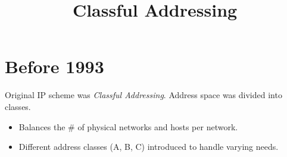 \documentclass{article}
\title{Classful Addressing}
\begin{document}
\maketitle

\section*{Before 1993}
Original IP scheme was \emph{Classful Addressing}. Address space was divided into classes.
\begin{itemize}
    \item Balances the \# of physical networks and hosts per network.
    \item Different address classes (A, B, C) introduced to handle varying needs.
\end{itemize}
\end{document}
